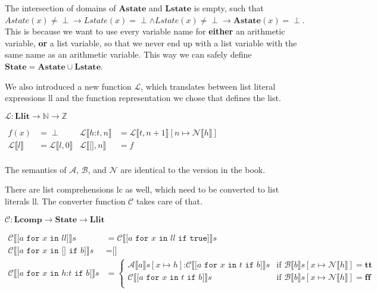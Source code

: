 \documentclass[12pt]{article}
\newcommand\mono\texttt
\newcommand{\metavar}[1]{\textlangle#1\textrangle}
\newcommand{\dblbr}[1]{\llbracket#1\rrbracket}
\newcommand{\fancybr}[2]{#1 \dblbr{#2}}
\renewcommand{\AA}{\mathcal{A}}
\newcommand{\BB}{\mathcal{B}}
\newcommand{\CC}{\mathcal{C}}
\newcommand{\LL}{\mathcal{L}}
\newcommand{\NN}{\mathcal{N}}
\newcommand{\State}{\mathbf{State}}
\newcommand{\Astate}{\mathbf{Astate}}
\newcommand{\Lstate}{\mathbf{Lstate}}
\newcommand{\Llit}{\mathbf{Llit}}
\newcommand{\Lcomp}{\mathbf{Lcomp}}
\begin{document}
The intersection of domains of $\Astate$ and $\Lstate$ is empty, such that $Astate(x) \neq \perp \rightarrow Lstate(x) = \perp \land Lstate(x) \neq \perp \rightarrow \Astate(x) = \perp$. This is because we want to use every variable name for \textbf{either} an arithmetic variable, \textbf{or} a list variable, so that we never end up with a list variable with the same name as an arithmetic variable. This way we can safely define $\State = \Astate \cup \Lstate$.

We also introduced a new function $\LL$, which translates between list literal expressions \metavar{ll} and the function representation we chose that defines the list.

$\LL: \Llit \rightarrow \mathbb{N} \rightarrow \mathbb{Z}$

$\begin{aligned}
    f(x) &= \perp & \fancybr{\LL}{h \mono{:} t, n} &= \fancybr{\LL}{t, n + 1}[n \mapsto \fancybr{\NN}{h}]\\
    \fancybr{\LL}{l} &= \fancybr{\LL}{l, 0} & \fancybr{\LL}{\mono{[]}, n} &= f\\
\end{aligned}$

The semantics of $\AA$, $\BB$, and $\NN$ are identical to the version in the book.

There are list comprehensions \metavar{lc} as well, which need to be converted to list literals \metavar{ll}. The converter function $\CC$ takes care of that.

$\CC: \Lcomp \rightarrow \State \rightarrow \Llit$

$\begin{aligned}
    \fancybr{\CC}{\mono{[} a \mono{ for } x \mono{ in } ll \mono{]}} s &= \fancybr{\CC}{\mono{[} a \mono{ for } x \mono{ in } ll \mono{ if true]}} s\\
    \fancybr{\CC}{\mono{[} a \mono{ for } x \mono{ in [] if } b \mono{]}} s &= \mono{[]}\\
    \fancybr{\CC}{\mono{[} a \mono{ for } x \mono{ in } h \mono{:} t \mono{ if } b \mono{]}} s &= \begin{cases}
        \fancybr{\AA}{a} s[x \mapsto h] \mono{:} \fancybr{\CC}{\mono{[} a \mono{ for } x \mono{ in } t \mono{ if } b\mono{]}} s
        & \text{if } \fancybr{\BB}{b} s[x \mapsto \fancybr{\NN}{h}] = \mathbf{tt}\\
        \fancybr{\CC}{\mono{[} a \mono{ for } x \mono{ in } t \mono{ if } b \mono{]}} s
        & \text{if } \fancybr{\BB}{b} s[x \mapsto \fancybr{\NN}{h}] = \mathbf{ff}\\
    \end{cases}\\
\end{aligned}$
\end{document}
